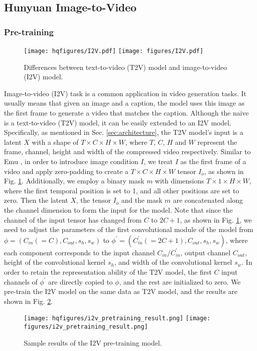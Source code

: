 \subsection{Hunyuan Image-to-Video}
\subsubsection{Pre-training}
\begin{figure}[t]
    \centering
    \ifhq
    \texttt{[image: hqfigures/I2V.pdf]}
    \else
    \texttt{[image: figures/I2V.pdf]}
    \fi
    \caption{Differences between text-to-video (T2V) model and image-to-video (I2V) model.}
    \label{fig:i2v}
\end{figure}
Image-to-video (I2V) task is a common application in video generation tasks. It usually means that given an image and a caption, the model uses this image as the first frame to generate a video that matches the caption.
Although the naive \nameofmethod{} is a text-to-video (T2V) model, it can be easily extended to an I2V model.
Specifically, as mentioned in Sec. \ref{sec:architecture}, the T2V model's input is a latent $X$ with a shape of $T \times C \times H \times W$, where $T$, $C$, $H$ and $W$ represent the frame, channel, height and width of the compressed video respectively.
Similar to Emu \cite{girdhar2023emu}, in order to introduce image condition $I$, we treat $I$ as the first frame of a video and apply zero-padding to create a $T \times C \times H \times W$ tensor $I_o$, as shown in Fig. \ref{fig:i2v}.
Additionally, we employ a binary mask $m$ with dimensions $T \times 1 \times H \times W$, where the first temporal position is set to 1, and all other positions are set to zero. Then the latent $X$, the tensor $I_o$ and the mask $m$ are concatenated along the channel dimension to form the input for the model.
Note that since the channel of the input tensor has changed from $C$ to $2C+1$, as shown in Fig. \ref{fig:i2v}, we need to adjust the parameters of the first convolutional module of the model from $\phi=(C_{in}(=C), C_{out}, s_h, s_w)$ to $\phi^{\prime}=(C_{in}^{\prime}(=2C+1), C_{out}, s_h, s_w)$, where each component corresponds to the input channel $C_{in}/C_{in}^{\prime}$, output channel $C_{out}$, height of the convolutional kernel $s_h$, and width of the convolutional kernel $s_w$.
In order to retain the representation ability of the T2V model, the first $C$ input channels of $\phi^{\prime}$ are directly copied to $\phi$, and the rest are initialized to zero. We pre-train the I2V model on the same data as T2V model, and the results are shown in Fig. \ref{fig:i2v_result}.
\begin{figure}[t]
    \centering
    \ifhq
    \texttt{[image: hqfigures/i2v\_pretraining\_result.png]}
    \else
    \texttt{[image: figures/i2v\_pretraining\_result.png]}
    \fi
    \caption{Sample results of the I2V pre-training model.}
    \label{fig:i2v_result}
\end{figure}
